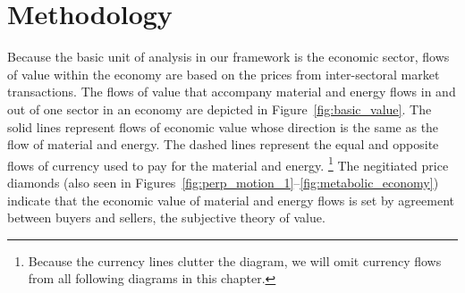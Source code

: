 \section{Methodology}
\label{sec:Value_Methodology}

Because the basic unit of analysis in our framework is the economic sector, 
flows of value within the economy are based on the prices  
from inter-sectoral market transactions. 
The flows of value that accompany material and energy flows in and out 
of one sector in an economy are depicted in Figure~\ref{fig:basic_value}. 
The solid lines represent flows of economic value whose direction
is the same as the flow of material and energy.
The dashed lines represent the equal and opposite
flows of currency used to pay for the material and energy.%
	\footnote{
	Because the currency lines clutter the diagram,
	we will omit currency flows from all following diagrams in this chapter.
	}
The negitiated price diamonds (also seen in Figures~\ref{fig:perp_motion_1}--\ref{fig:metabolic_economy})
indicate that the economic value of material and energy flows is
set by agreement between buyers and sellers, the subjective theory of value.

%

